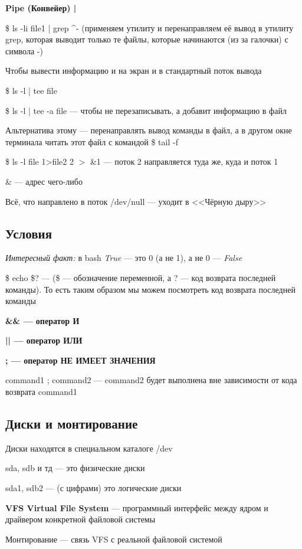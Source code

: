 \documentclass[oneside, final, 14pt]{extreport} %
\begin{document}
\textbf{Pipe (Конвейер) |}

\$ ls -li file1 | grep \^ \-- (применяем утилиту и перенаправляем её вывод в утилиту grep, которая 
выводит только те файлы, которые начинаются (из за галочки)  с символа \--)

Чтобы вывести информацию и на экран и в стандартный поток вывода

\$ ls -l | tee file

\$ ls -l | tee -a file --- чтобы не перезаписывать, а добавит информацию в файл

Альтернатива этому --- перенаправлять вывод команды в файл, а в другом окне 
терминала читать этот файл с командой \$ tail -f

\$ ls -l file 1>file2 2 $>$ \&1 --- поток 2 направляется туда же, куда и поток 1

\& --- адрес чего-либо

Всё, что направлено в поток /dev/null --- уходит в <<Чёрную дыру>>

\subsection{Условия}

\textit{Интересный факт:} в bash \textit{True} --- это 0 (а не 1), а не 0 --- \textit{False}

\$ echo \$? --- (\$ --- обозначение переменной, а ? --- код возврата последней команды). То есть таким образом
мы можем посмотреть код возврата последней команды

\textbf{\&\& --- оператор И}

\textbf{|| --- оператор ИЛИ}

\textbf{; --- оператор НЕ ИМЕЕТ ЗНАЧЕНИЯ}

command1 ; command2 --- command2 будет выполнена вне зависимости от кода возврата command1

\subsection{Диски и монтирование}
Диски находятся в специальном каталоге /dev

sda, sdb  и тд --- это физические диски

sda1, sdb2 --- (с цифрами) это логические диски

\textbf{VFS Virtual File System} --- программный интерфейс между ядром и драйвером конкретной
файловой системы

Монтирование --- связь VFS с реальной файловой системой
\end{document}
